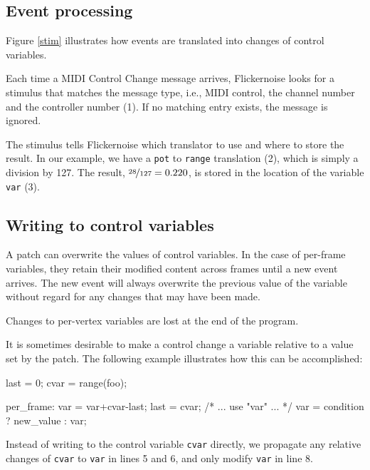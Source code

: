 \documentclass[11pt,a4paper]{article}
\begin{document}


\figstim

\subsection{Event processing}

Figure \ref{stim} illustrates how events are translated into changes
of control variables.

Each time a MIDI Control Change message arrives, Flickernoise looks for a
stimulus that matches the message type, i.e., MIDI control, the channel
number and the controller number (1). If no matching entry exists,
the message is ignored.

The stimulus tells Flickernoise which translator to use and where
to store the result. In our example, we have a {\tt pot} to {\tt range}
translation (2), which is simply a division by 127. The result,
$\nicefrac{28}{127}=0.220$, is stored in the location of the variable
{\tt var} (3).




\subsection{Writing to control variables}

A patch can overwrite the values of control variables. In the case of
per-frame variables, they retain their modified content across
frames until a new event arrives. The new event will always overwrite
the previous value of the variable without regard for any changes that
may have been made.

Changes to per-vertex variables are lost at the end of the program.

It is sometimes desirable to make a control change a variable relative
to a value set by the patch. The following example illustrates how
this can be accomplished:

\begin{listing}{1}
last = 0;
cvar = range(foo);

per_frame:
	var = var+cvar-last;
	last = cvar;
	/* ... use "var" ... */
	var = condition ? new_value : var;
\end{listing}

Instead of writing to the control variable {\tt cvar} directly, we
propagate any relative changes of {\tt cvar} to {\tt var} in lines
5 and 6, and only modify {\tt var} in line 8.
\end{document}
